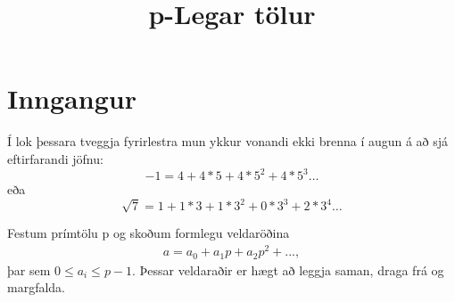 
\title{p-Legar tölur}

\maketitle
\section*{Inngangur}
Í lok þessara tveggja fyrirlestra mun ykkur vonandi ekki brenna í augun á að sjá eftirfarandi jöfnu:
\begin{equation*}
-1 = 4 + 4*5+4*5^2+4*5^3 \ldots
\end{equation*}
eða 
\begin{equation*}
\sqrt{7} = 1 + 1*3 + 1*3^2+0*3^3+2*3^4 \ldots
\end{equation*}

Festum prímtölu p og skoðum formlegu veldaröðina
\begin{align*}
a = a_0 + a_1 p + a_2 p^2 + ...,
\end{align*}
þar sem $0 \leq a_i \leq p-1$. Þessar veldaraðir er hægt að leggja saman, draga frá og margfalda.



